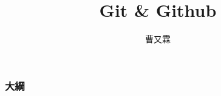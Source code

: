 \documentclass[pdf,16pt]{beamer}
\title{Git \& Github}
\author{曹又霖}
\begin{document}
  \begin{frame}
    \titlepage
  \end{frame}
  
  \begin{frame}
    \frametitle{大綱} %
    \tableofcontents %
  \end{frame}
  
\end{document}
